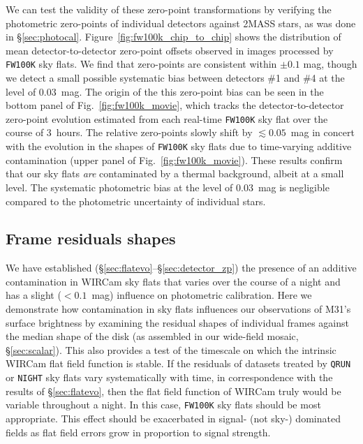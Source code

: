 \documentclass[iop]{emulateapj}
\newcommand{\Fig}[1]{Fig.~\ref{fig:#1}}  %
\newcommand{\Sec}[1]{\S\ref{sec:#1}}  %
\begin{document}
We can test the validity of these zero-point transformations by verifying the photometric zero-points of individual detectors against 2MASS stars, as was done in \Sec{photocal}.
Figure~\ref{fig:fw100k_chip_to_chip} shows the distribution of mean detector-to-detector zero-point offsets observed in images processed by \texttt{FW100K} sky flats.
We find that zero-points are consistent within $\pm 0.1$ mag, though we detect a small possible systematic bias between detectors \#1 and \#4 at the level of $0.03$~mag.
The origin of the this zero-point bias can be seen in the bottom panel of \Fig{fw100k_movie}, which tracks the detector-to-detector zero-point evolution estimated from each real-time \texttt{FW100K} sky flat over the course of 3~hours.
The relative zero-points slowly shift by $\lesssim 0.05$~mag in concert with the evolution in the shapes of \texttt{FW100K} sky flats due to time-varying additive contamination (upper panel of \Fig{fw100k_movie}).
These results confirm that our sky flats \emph{are} contaminated by a thermal background, albeit at a small level.
The systematic photometric bias at the level of $0.03$~mag is negligible compared to the photometric uncertainty of individual stars.

\subsection{Frame residuals shapes}
\label{sec:frameblockresiduals}

We have established (\Sec{flatevo}--\Sec{detector_zp}) the presence of an additive contamination in WIRCam sky flats that varies over the course of a night and has a slight ($<0.1$~mag) influence on photometric calibration.
Here we demonstrate how contamination in sky flats influences our observations of M31's surface brightness by examining the residual shapes of individual frames against the median shape of the disk (as assembled in our wide-field mosaic, \Sec{scalar}).
This also provides a test of the timescale on which the intrinsic WIRCam flat field function is stable.
If the residuals of datasets treated by \texttt{QRUN} or \texttt{NIGHT} sky flats vary systematically with time, in correspondence with the results of \Sec{flatevo}, then the flat field function of WIRCam truly would be variable throughout a night.
In this case, \texttt{FW100K} sky flats should be most appropriate.
This effect should be exacerbated in signal- (not sky-) dominated fields as flat field errors grow in proportion to signal strength.
\end{document}

